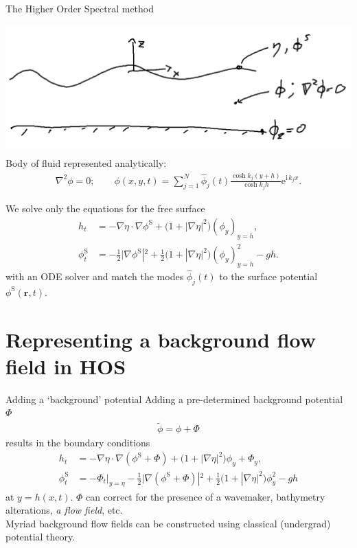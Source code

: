 \documentclass{sintefbeamer}
\newcommand{\mr}{\mathrm}
\renewcommand{\S}{^\mr{S}}
\newcommand{\ii}{\mr{i}\,}
\newcommand{\ee}{\mr{e}}
\renewcommand{\_}[1]{_\mr{#1}}
\begin{document}
\begin{frame}{The Higher Order Spectral method}
\vspace{-1cm}
\begin{center}
\includegraphics[width=.5\framewidth]{HOS1.png}
\end{center}

Body of fluid represented analytically:
\begin{align*}
\nabla^2\phi = 0;\qquad  \phi(x,y,t) = \sum_{j=1}^N \hat\phi_j(t) \frac{\cosh k_j(y+h)}{\cosh k_j h} \ee^{\ii k_j x}.
\end{align*}

We solve only the equations for the free surface 
\begin{align*}
h_t &=   - \nabla\eta\cdot\nabla\phi\S     + \big(1+|\nabla\eta|^2\big)(\phi_y)_{y=h}, %
\\
\phi\S_t &= - \frac12\big|\nabla\phi\S|^2 + \frac12\big(1+|\nabla\eta|^2\big)(\phi_y)_{y=h}^2 - gh.
\end{align*}
with an ODE solver and match the modes $\hat\phi_j(t) $ to the surface potential $\phi\S(\bm r,t)$.
\end{frame}


\section{Representing a background flow field in HOS}

\begin{frame}{Adding a `background' potential}
	\vspace{-5mm}
	Adding a  pre-determined background potential $\Phi$
	\begin{align*}
		\tilde\phi = \phi + \Phi
	\end{align*}
	results in the boundary conditions
	\begin{align*}
		h_t &=   - \nabla\eta\cdot\nabla(\phi\S +\Phi)  + \big(1+|\nabla\eta|^2\big)\phi_y + \Phi_y,
		\\
		\phi\S_t &= -\Phi_t\big|_{y=\eta} - \frac12\big|\nabla(\phi\S +\Phi)|^2 + \frac12\big(1+|\nabla\eta|^2\big)\phi_y^2 - g h
	\end{align*}
	at $y=h(x,t)$.
	$\Phi$ can correct for the presence of a wavemaker, bathymetry alterations, \textit{a flow field}, etc. \\
	
	Myriad background flow fields can be constructed using classical (undergrad) potential theory.	
\end{frame}
\end{document}
